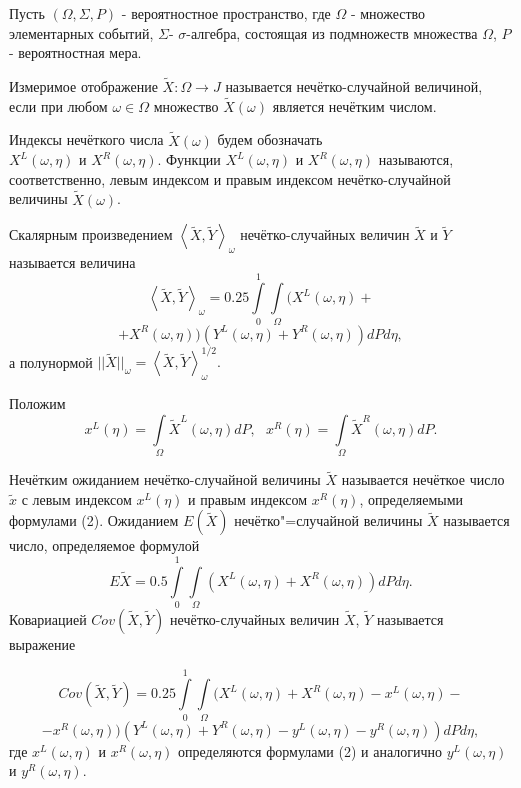 Пусть $(\Omega, \Sigma, P)$ - вероятностное пространство, где $\Omega$ - множество элементарных событий, $\Sigma $- $\sigma$-алгебра, состоящая из подмножеств множества $\Omega$, $P$ - вероятностная мера.

Измеримое отображение $\tilde{X}:\Omega\rightarrow J$ называется нечётко-случайной величиной, если при любом $\omega\in\Omega$ множество $\tilde{X}(\omega)$ является нечётким числом.

Индексы нечёткого числа $\tilde{X}(\omega)$ будем обозначать
\\$X^L(\omega, \eta)$ и $X^R(\omega, \eta)$. Функции $X^L(\omega, \eta)$ и $X^R(\omega, \eta)$ называются, соответственно, левым индексом и правым индексом нечётко-случайной величины $\tilde{X}(\omega)$.



Скалярным произведением $\left\langle \tilde{X}, \tilde{Y}\right\rangle_{\omega}$ нечётко-случайных величин $\tilde{X}$ и $\tilde{Y}$ называется величина
$$
\left\langle \tilde{X}, \tilde{Y}\right\rangle_{\omega} = 0.25\int\limits_0^1\int\limits_{\Omega}(X^L(\omega, \eta) +
$$
$$
 + X^R(\omega, \eta))(Y^L(\omega, \eta) + Y^R(\omega, \eta))dPd\eta,
$$
а полунормой $||\tilde{X}||_{\omega} = \left\langle \tilde{X}, \tilde{Y}\right\rangle_{\omega}^{1/2}.$


Положим
\begin{equation}
x^L(\eta) = \int\limits_{\Omega}\tilde{X}^L(\omega, \eta)dP,\,\,\,\,x^R(\eta) = \int\limits_{\Omega}\tilde{X}^R(\omega, \eta)dP.
\end{equation}

Нечётким ожиданием нечётко-случайной величины $\tilde{X}$
\linebreak
называется нечёткое число $\tilde{x}$ с левым индексом $x^L(\eta)$ и правым индексом $x^R(\eta)$, определяемыми формулами (2).
Ожиданием $E(\tilde{X})$ нечётко"=случайной величины $\tilde{X}$ называется число, определяемое формулой
$$
E\tilde{X} = 0.5\int\limits_0^1\int\limits_{\Omega}(X^L(\omega, \eta) + X^R(\omega, \eta))dPd\eta.
$$
Ковариацией $Cov(\tilde{X}, \tilde{Y})$ нечётко-случайных величин $\tilde{X}$, $\tilde{Y}$ называется выражение

$$
Cov(\tilde{X}, \tilde{Y}) = 0.25\int\limits_0^1\int\limits_{\Omega}(X^L(\omega, \eta) + X^R(\omega, \eta) - x^L(\omega, \eta) - $$
$$
-x^R(\omega, \eta))(Y^L(\omega, \eta) + Y^R(\omega, \eta) - y^L(\omega, \eta) - y^R(\omega, \eta))dPd\eta
,
$$
где $x^L(\omega, \eta)$ и $x^R(\omega, \eta)$ определяются формулами (2) и аналогично $y^L(\omega, \eta)$ и $y^R(\omega, \eta)$.


